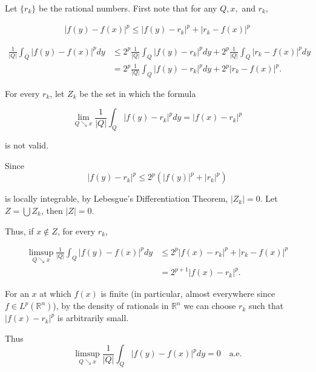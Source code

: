 \documentclass[UTF8,a4paper,10pt]{article}
\begin{document}
Let \(\{r_k\}\) be the rational numbers. First note that for any \(Q, x,\) and \(r_k\),

\begin{equation*}
  \begin{aligned}
   |f(y) - f(x)|^p \leq  |f(y) - r_k|^p +|r_k - f(x)|^p 
  \end{aligned}
  \end{equation*}
  
\begin{equation*}
\begin{aligned}
\frac{1}{|Q|} \int_Q |f(y) - f(x)|^p dy &\leq 2^p \frac{1}{|Q|} \int_Q |f(y) - r_k|^p dy + 2^p \frac{1}{|Q|} \int_Q |r_k - f(x)|^p dy \\
&= 2^p \frac{1}{|Q|} \int_Q |f(y) - r_k|^p dy + 2^p |r_k - f(x)|^p.
\end{aligned}
\end{equation*}

For every \(r_k\), let \(Z_k\) be the set in which the formula

\begin{equation*}
\lim_{Q \searrow  x} \frac{1}{|Q|} \int_Q |f(y) - r_k|^p dy = |f(x) - r_k|^p
\end{equation*}

is not valid. 

Since
\begin{equation*}
|f(y) - r_k|^p \leq 2^p (|f(y)|^p + |r_k|^p)
\end{equation*}

is locally integrable, by Lebesgue's Differentiation Theorem, \(|Z_k| = 0\). Let \(Z = \bigcup Z_k\), then \(|Z| = 0\).

Thus, if \(x \notin Z\), for every \(r_k\),

\begin{equation*}
  \begin{aligned}
\limsup_{Q \searrow x} \frac{1}{|Q|} \int_Q |f(y) - f(x)|^p dy &\leq 2^p |f(x) - r_k|^p + | r_k - f(x)|^p
\\
& = 2^{p+1} |f(x) - r_k|^p.
\end{aligned}
\end{equation*}

For an \(x\) at which \(f(x)\) is finite (in particular, almost everywhere since \(f \in L^p(\mathbb{R}^n)\)), by the density of rationals in \(\mathbb{R}^n\) we can choose \(r_k\) such that \(|f(x) - r_k|^p\) is arbitrarily small.

Thus
\begin{equation*}
\limsup_{Q \searrow x} \frac{1}{|Q|} \int_Q |f(y) - f(x)|^p dy = 0 \quad \text{a.e.}
\end{equation*}
\end{document}
